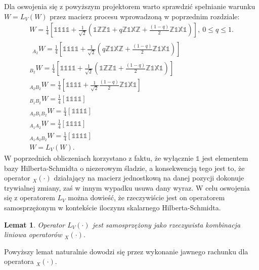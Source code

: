 \documentclass[10pt]{article} %
\newtheorem{lm}{Lemat}
\newcommand{\X}{\mathbb{X}}
\newcommand{\Z}{\mathbb{Z}}
\newcommand{\I}{\mathbb{1}}
\begin{document}
Dla oswojenia się z powyższym projektorem warto sprawdzić spełnianie warunku $W = L_V(W)$ przez macierz procesu wprowadzoną w poprzednim rozdziale:
\begin{gather}
W = \frac{1}{4}\left[
\I\I\I\I + \frac{1}{\sqrt{2}}(\I\Z\Z\I + q\Z\I\X\Z + \frac{(1-q)}{2}\Z\I\X\I)
\right],~ 0 \leq q \leq 1. \\ 
\begin{split}
{}_{A_2} W =  \frac{1}{4}\left[
\I\I\I\I + \frac{1}{\sqrt{2}}(q\Z\I\X\Z + \frac{(1-q)}{2}\Z\I\X\I)
\right]
\end{split} \\
{}_{B_2}W =  \frac{1}{4}\left[
\I\I\I\I + \frac{1}{\sqrt{2}}(\I\Z\Z\I + \frac{(1-q)}{2}\Z\I\X\I)
\right] \\
{}_{A_2B_2}W = 
 \frac{1}{4}\left[
\I\I\I\I + \frac{1}{\sqrt{2}}\frac{(1-q)}{2}\Z\I\X\I
\right] \\
{}_{B_1B_2}W =  \frac{1}{4}\left[
\I\I\I\I
\right]\\
{}_{A_2B_1B_2}W =  \frac{1}{4}\left[
\I\I\I\I
\right]\\
{}_{A_1A_2}W =  \frac{1}{4}\left[
\I\I\I\I
\right]\\
{}_{A_1A_2B_2}W =  \frac{1}{4}\left[
\I\I\I\I
\right] \\
W = L_V(W).
\end{gather} W poprzednich obliczeniach korzystano z faktu, że wyłącznie $\I$ jest elementem bazy Hilberta-Schmidta o niezerowym śladzie, a konsekwencją tego jest to, że operator ${}_X(\cdot)$ działający na macierz jednostkową na danej pozycji dokonuje trywialnej zmiany, zaś w innym wypadku usuwa dany wyraz. 
W celu oswojenia się z operatorem $L_V$ można dowieść, że rzeczywiście jest on operatorem samosprzężonym w kontekście iloczynu skalarnego Hilberta-Schmidta.
\begin{lm}
Operator $L_V(\cdot)$ jest samosprzężony jako rzeczywista kombinacja liniowa operatorów ${}_X(\cdot)$.
\end{lm}
Powyższy lemat naturalnie dowodzi się przez wykonanie jawnego rachunku dla operatora ${}_X(\cdot)$.
\end{document}
